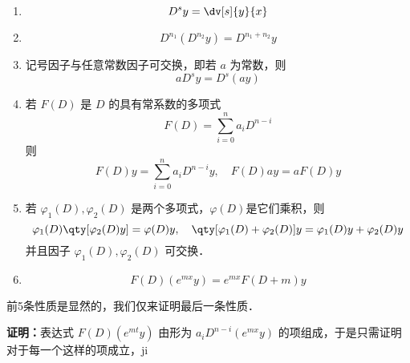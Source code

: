 \begin{enumerate}
\item 
\begin{equation}
D^sy=\dv[s]{y}{x}
\end{equation}
\item 
\begin{equation}
D^{n_1}(D^{n_2}y)=D^{n_1+n_2}y
\end{equation}
\item 记号因子与任意常数因子可交换，即若 $a$ 为常数，则
\begin{equation}
aD^sy=D^s(ay)
\end{equation}
\item 若 $F(D)$ 是 $D$ 的具有常系数的多项式
\begin{equation}
F(D)=\sum_{i=0}^{n}a_iD^{n-i}
\end{equation}
则
\begin{equation}
F(D)y=\sum_{i=0}^{n}a_iD^{n-i}y,\quad F(D)ay=aF(D)y
\end{equation}
\item 若 $\varphi_1(D),\varphi_2(D)$ 是两个多项式，$\varphi(D)$是它们乘积，则
\begin{equation}
\varphi_1(D)\qty[\varphi_2(D)y]=\varphi(D)y,\quad \qty[\varphi_1(D)+\varphi_2(D)]y=\varphi_1(D)y+\varphi_2(D)y
\end{equation}
并且因子 $\varphi_1(D),\varphi_2(D)$ 可交换．
\item \begin{equation}
F(D)(e^{mx}y)=e^{mx}F(D+m)y
\end{equation}
\end{enumerate}

前5条性质是显然的，我们仅来证明最后一条性质．

\textbf{证明：}表达式 $F(D)(e^{mt}y)$ 由形为 $a_{i}D^{n-i}(e^{mx}y)$ 的项组成，于是只需证明对于每一个这样的项成立，ji




